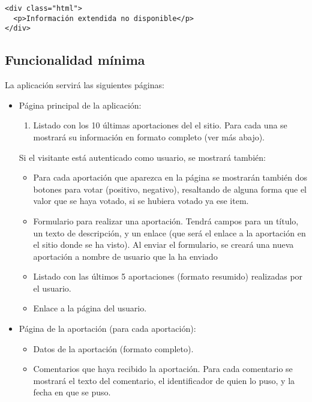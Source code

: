 \begin{verbatim}
<div class="html">
  <p>Información extendida no disponible</p>
</div>
\end{verbatim}


\subsection{Funcionalidad mínima}

La aplicación servirá las siguientes páginas:

\begin{itemize}
  \item Página principal de la aplicación:
  
    \begin{enumerate}
    \item Listado con los 10 últimas aportaciones del el sitio. Para cada una se mostrará su información en formato completo (ver más abajo).
    \end{enumerate}

    Si el visitante está autenticado como usuario, se mostrará también:

    \begin{itemize}
    \item Para cada aportación que aparezca en la página se mostrarán también dos botones para votar (positivo, negativo), resaltando de alguna forma que el valor que se haya votado, si se hubiera votado ya ese item.
    \item Formulario para realizar una aportación. Tendrá campos para un título, un texto de descripción, y un enlace (que será el enlace a la aportación en el sitio donde se ha visto). Al enviar el formulario, se creará una nueva aportación a nombre de usuario que la ha enviado
    \item Listado con las últimos 5 aportaciones (formato resumido) realizadas por el usuario.
    \item Enlace a la página del usuario.
    \end{itemize}

  \item Página de la aportación (para cada aportación):

    \begin{itemize}
    \item Datos de la aportación (formato completo).
    \item Comentarios que haya recibido la aportación. Para cada comentario se mostrará el texto del comentario, el identificador de quien lo puso, y la fecha en que se puso.
    \end{itemize}


\end{itemize}
